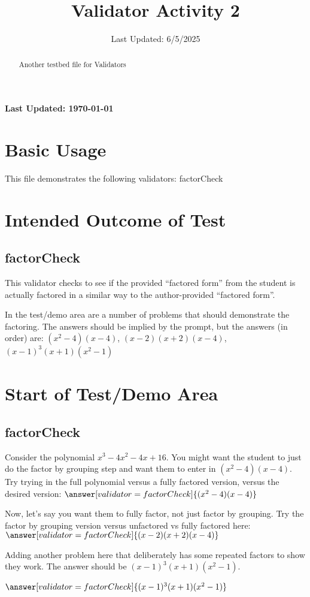 \documentclass{ximera}
\title{Validator Activity 2}
\date{Last Updated: 6/5/2025}
\begin{document}
\begin{abstract}
    Another testbed file for Validators
\end{abstract}
\maketitle

{{\Huge \bfseries Last Updated: \today}} \\

\section{Basic Usage}

This file demonstrates the following validators: factorCheck

\section{Intended Outcome of Test}
    \subsection*{factorCheck}
        This validator checks to see if the provided ``factored form'' from the student 
        is actually factored in a similar way to the author-provided ``factored form''.
        
        In the test/demo area are a number of problems that should demonstrate the factoring. The answers should be implied by the prompt, 
        but the answers (in order) are: $(x^2-4)(x-4)$, $(x-2)(x+2)(x-4)$, $(x-1)^3(x+1)(x^2-1)$

\section{Start of Test/Demo Area}

    \subsection*{factorCheck}
\begin{problem}
    Consider the polynomial $x^3 - 4x^2 - 4x + 16$. You might want the student to just do the factor by grouping step 
    and want them to enter in $(x^2-4)(x-4)$. 
    Try trying in the full polynomial versus a fully factored version, 
    versus the desired version: $\answer[validator=factorCheck]{(x^2-4)(x-4)}$
\end{problem}

\begin{problem}
    Now, let's say you want them to fully factor, not just factor by grouping. 
    Try the factor by grouping version versus unfactored vs fully factored here: $\answer[validator=factorCheck]{(x-2)(x+2)(x-4)}$
\end{problem}
 
\begin{problem}
    Adding another problem here that deliberately has some repeated factors to show they work. 
    The answer should be $(x-1)^3(x+1)(x^2-1)$.
     
    $\answer[validator=factorCheck]{(x-1)^3(x+1)(x^2-1)}$
\end{problem}


\hrulefill
\end{document}
